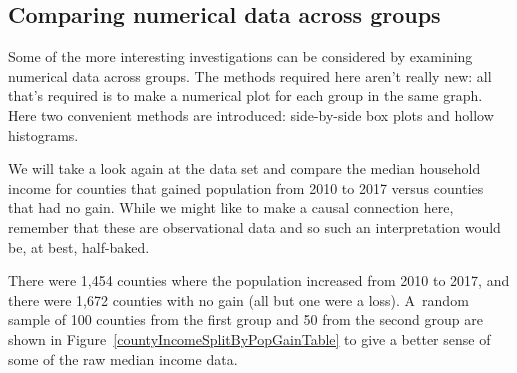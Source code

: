 

\D{\newpage}

\subsection{Comparing numerical data across groups}
\label{comparingAcrossGroups}


Some of the more interesting investigations can be considered
by examining numerical data across groups.
The methods required here aren't really new:
all that's required is to make a numerical plot for each group
in the same graph.
Here two convenient methods are introduced:
side-by-side box plots and hollow histograms.

We will take a look again at the  data set
and compare the median household income for counties that
gained population from 2010 to 2017 versus counties that
had no gain.
While we might like to make a causal connection here,
remember that these are observational data and so such
an interpretation would be, at best, half-baked.

\newcommand{\numcountieswithgains}{1454}
\newcommand{\numcountieswithgainsC}{1,454}
\newcommand{\numcountieswithoutgains}{1672}
\newcommand{\numcountieswithoutgainsC}{1,672}

There were \numcountieswithgainsC{} counties where
the population increased from 2010 to 2017, and there
were \numcountieswithoutgainsC{} counties with no gain
(all but one were a loss).
A~random sample of 100 counties from the first group and
50 from the second group are shown in
Figure~\ref{countyIncomeSplitByPopGainTable}
to give a better sense of some of the raw median
income data.

